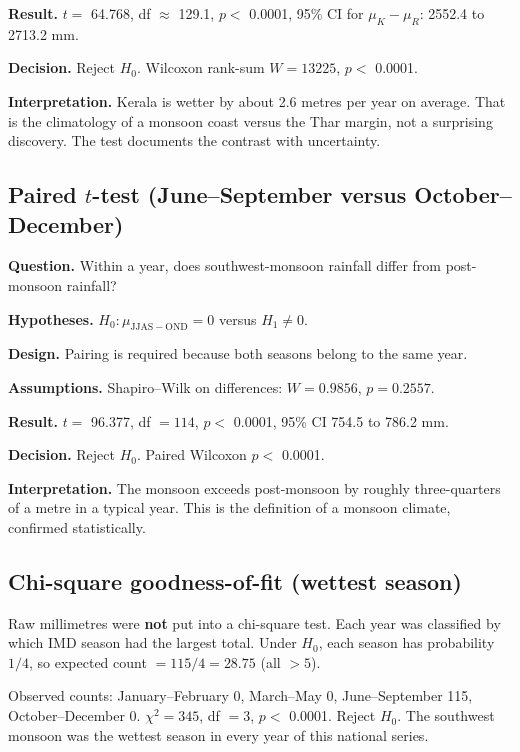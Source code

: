 \documentclass[
]{article}
\begin{document}
\textbf{Result.} \(t=\) 64.768, df \(\approx\) 129.1, \(p<\) 0.0001,
95\% CI for \(\mu_K-\mu_R\): 2552.4 to 2713.2 mm.

\textbf{Decision.} Reject \(H_0\). Wilcoxon rank-sum \(W=13225\), \(p<\)
0.0001.

\textbf{Interpretation.} Kerala is wetter by about 2.6 metres per year
on average. That is the climatology of a monsoon coast versus the Thar
margin, not a surprising discovery. The test documents the contrast with
uncertainty.

\subsection{\texorpdfstring{Paired \(t\)-test (June--September versus
October--December)}{Paired t-test (June--September versus October--December)}}\label{paired-t-test-juneseptember-versus-octoberdecember}

\textbf{Question.} Within a year, does southwest-monsoon rainfall differ
from post-monsoon rainfall?

\textbf{Hypotheses.} \(H_0:\mu_{\mathrm{JJAS}-\mathrm{OND}}=0\) versus
\(H_1\neq 0\).

\textbf{Design.} Pairing is required because both seasons belong to the
same year.

\textbf{Assumptions.} Shapiro--Wilk on differences: \(W=0.9856\),
\(p=0.2557\).

\textbf{Result.} \(t=\) 96.377, df \(=114\), \(p<\) 0.0001, 95\% CI
754.5 to 786.2 mm.

\textbf{Decision.} Reject \(H_0\). Paired Wilcoxon \(p<\) 0.0001.

\textbf{Interpretation.} The monsoon exceeds post-monsoon by roughly
three-quarters of a metre in a typical year. This is the definition of a
monsoon climate, confirmed statistically.

\subsection{Chi-square goodness-of-fit (wettest
season)}\label{chi-square-goodness-of-fit-wettest-season}

Raw millimetres were \textbf{not} put into a chi-square test. Each year
was classified by which IMD season had the largest total. Under \(H_0\),
each season has probability \(1/4\), so expected count \(=115/4=28.75\)
(all \(>5\)).

Observed counts: January--February 0, March--May 0, June--September 115,
October--December 0. \(\chi^2=345\), df \(=3\), \(p<\) 0.0001. Reject
\(H_0\). The southwest monsoon was the wettest season in every year of
this national series.
\end{document}
